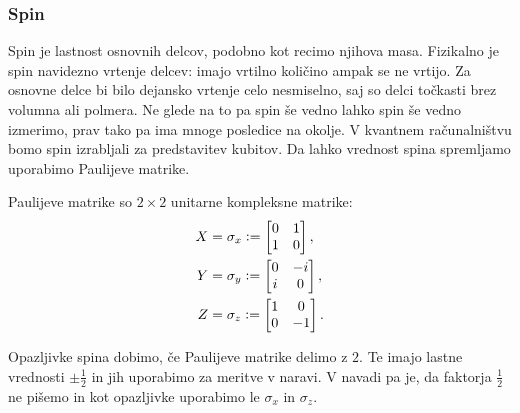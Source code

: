 \documentclass[mat1]{fmfdelo}
\newcommand{\defeq}{\vcentcolon=}
\begin{document}
\subsubsection{Spin}
Spin je lastnost osnovnih delcov, podobno kot recimo njihova masa. Fizikalno je spin navidezno vrtenje delcev: imajo vrtilno količino ampak se ne vrtijo. Za osnovne delce bi bilo dejansko vrtenje celo nesmiselno, saj so delci točkasti brez volumna ali polmera. Ne glede na to pa spin še vedno lahko spin še vedno izmerimo, prav tako pa ima mnoge posledice na okolje. V kvantnem računalništvu bomo spin izrabljali za predstavitev kubitov. Da lahko vrednost spina spremljamo uporabimo Paulijeve matrike.
\begin{definicija} Paulijeve matrike so \(2\times 2\) unitarne kompleksne matrike:
    \begin{align*}
        X &= \sigma_x \defeq \begin{bmatrix}
            0&1\\
            1&0
        \end{bmatrix},\\
        Y &= \sigma_y \defeq \begin{bmatrix}
            0&-i\\
            i&0
        \end{bmatrix},\\
        Z &= \sigma_z \defeq \begin{bmatrix}
            1&0\\
            0&-1
        \end{bmatrix}.
    \end{align*}
\end{definicija}
Opazljivke spina dobimo, če Paulijeve matrike delimo z \(2\). Te imajo lastne vrednosti \(\pm \frac12\) in jih uporabimo za meritve v naravi. V navadi pa je, da faktorja \(\frac12\) ne pišemo in kot opazljivke uporabimo le \(\sigma_x\) in \(\sigma_z\).
\end{document}
